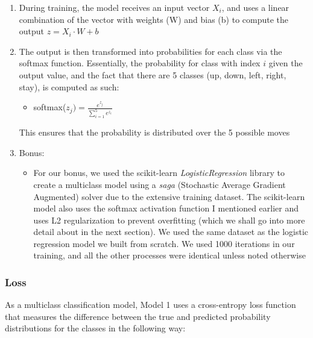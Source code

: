 \documentclass[11pt]{article}
\begin{document}
\begin{enumerate}
    \item During training, the model receives an input vector $X_i$, and uses a linear combination of the vector with weights (W) and bias (b) to compute the output $z = X_i \cdot W + b$
    \item The output is then transformed into probabilities for each class via the softmax function. Essentially, the probability for class with index $i$ given the output value, and the fact that there are 5 classes (up, down, left, right, stay), is computed as such:
    \begin{itemize}
        \item softmax($z_j) = \frac{e^{z_j}}{\sum_{i=1}^{5} e^{z_i}}$
    \end{itemize}
    This ensures that the probability is distributed over the 5 possible moves
    \item Bonus:
    \begin{itemize}
        \item For our bonus, we used the scikit-learn \emph{LogisticRegression} library to create a multiclass model using a \emph{saga} (Stochastic Average Gradient Augmented) solver due to the extensive training dataset. The scikit-learn model also uses the softmax activation function I mentioned earlier and uses L2 regularization to prevent overfitting (which we shall go into more detail about in the next section). We used the same dataset as the logistic regression model we built from scratch. We used 1000 iterations in our training, and all the other processes were identical unless noted otherwise
    \end{itemize}
\end{enumerate}

\subsubsection{Loss}

As a multiclass classification model, Model 1 uses a cross-entropy loss function that measures the difference between the true and predicted probability distributions for the classes in the following way:
\end{document}
